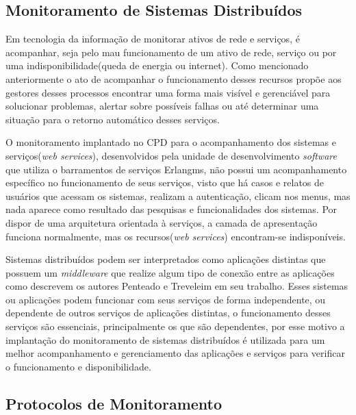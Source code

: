 
\subsection{Monitoramento de Sistemas Distribuídos}

Em tecnologia da informação de monitorar ativos de rede e serviços, é acompanhar, seja pelo mau funcionamento de um ativo de rede, serviço ou por uma indisponibilidade(queda de energia ou internet). Como mencionado anteriormente o ato de acompanhar o funcionamento desses recursos propõe aos gestores desses processos encontrar uma forma mais visível e gerenciável para solucionar problemas, alertar sobre possíveis falhas ou até determinar uma situação para o retorno automático desses serviços. 

O monitoramento implantado no \acrshort{CPD} para o acompanhamento dos sistemas e serviços(\textit{web services}), desenvolvidos pela unidade de desenvolvimento \textit{software} que utiliza o barramentos de serviços Erlangms, não possui um acompanhamento específico no funcionamento de seus serviços, visto que há casos e relatos de usuários que acessam os sistemas, realizam a autenticação, clicam nos menus, mas nada aparece como resultado das pesquisas e funcionalidades dos sistemas. Por dispor de uma arquitetura orientada à serviços, a camada de apresentação funciona normalmente, mas os recursos(\textit{web services}) encontram-se indisponíveis.

Sistemas distribuídos podem ser interpretados como aplicações distintas que possuem um \textit{middleware} que realize algum tipo de conexão entre as aplicações como descrevem os autores Penteado e Treveleim \cite{penteado2012jmonitor} em seu trabalho. Esses sistemas ou aplicações podem funcionar com seus serviços de forma independente, ou dependente de outros serviços de aplicações distintas, o funcionamento desses serviços são essenciais, principalmente os que são dependentes, por esse motivo a implantação do monitoramento de sistemas distribuídos é utilizada para um melhor acompanhamento e gerenciamento das aplicações e serviços para verificar o funcionamento e disponibilidade.   


\subsection{Protocolos de Monitoramento}

